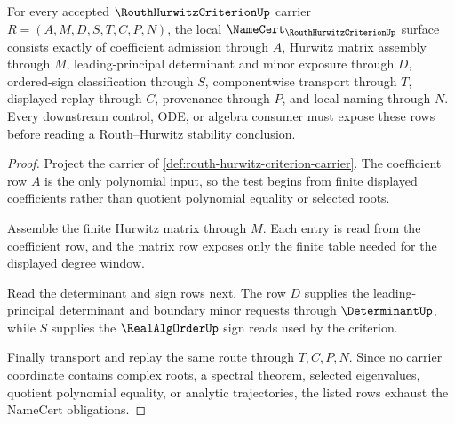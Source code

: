 \begin{theorem}
\label{thm:routh-hurwitz-criterion-namecert-obligations}
For every accepted $\RouthHurwitzCriterionUp$ carrier $R=(A,M,D,S,T,C,P,N)$, the local $\NameCert_{\RouthHurwitzCriterionUp}$ surface consists exactly of coefficient admission through $A$, Hurwitz matrix assembly through $M$, leading-principal determinant and minor exposure through $D$, ordered-sign classification through $S$, componentwise transport through $T$, displayed replay through $C$, provenance through $P$, and local naming through $N$. Every downstream control, ODE, or algebra consumer must expose these rows before reading a Routh--Hurwitz stability conclusion.
\end{theorem}
\begin{proof}
Project the carrier of \autoref{def:routh-hurwitz-criterion-carrier}. The coefficient row $A$ is the only polynomial input, so the test begins from finite displayed coefficients rather than quotient polynomial equality or selected roots.

Assemble the finite Hurwitz matrix through $M$. Each entry is read from the coefficient row, and the matrix row exposes only the finite table needed for the displayed degree window.

Read the determinant and sign rows next. The row $D$ supplies the leading-principal determinant and boundary minor requests through $\DeterminantUp$, while $S$ supplies the $\RealAlgOrderUp$ sign reads used by the criterion.

Finally transport and replay the same route through $T,C,P,N$. Since no carrier coordinate contains complex roots, a spectral theorem, selected eigenvalues, quotient polynomial equality, or analytic trajectories, the listed rows exhaust the NameCert obligations.
\end{proof}

